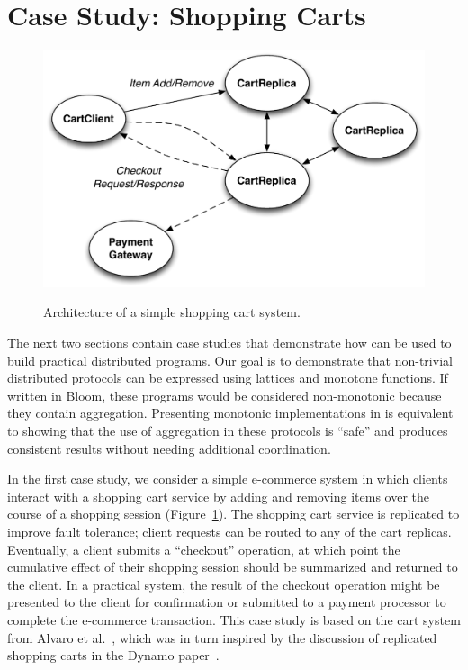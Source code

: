 \section{Case Study: Shopping Carts}
\label{sec:carts}
\begin{figure}[t]
\includegraphics[width=\linewidth]{fig/cart_arch.pdf}
\label{fig:cart-system}
\caption{Architecture of a simple shopping cart system.}
\end{figure}

The next two sections contain case studies that demonstrate how \lang can be
used to build practical distributed programs. Our goal is to demonstrate that
non-trivial distributed protocols can be expressed using lattices and monotone
functions. If written in Bloom, these programs would be considered non-monotonic
because they contain aggregation. Presenting monotonic implementations in \lang
is equivalent to showing that the use of aggregation in these protocols is
``safe'' and produces consistent results without needing additional
coordination.

In the first case study, we consider a simple e-commerce system in which clients
interact with a shopping cart service by adding and removing items over the
course of a shopping session (Figure~\ref{fig:cart-system}). The shopping cart
service is replicated to improve fault tolerance; client requests can be routed
to any of the cart replicas. Eventually, a client submits a ``checkout''
operation, at which point the cumulative effect of their shopping session should
be summarized and returned to the client. In a practical system, the result
of the checkout operation might be presented to the client for confirmation or
submitted to a payment processor to complete the e-commerce transaction. This
case study is based on the cart system from Alvaro et al.~\cite{Alvaro2011},
which was in turn inspired by the discussion of replicated shopping carts in the
Dynamo paper~\cite{DeCandia2007}.

